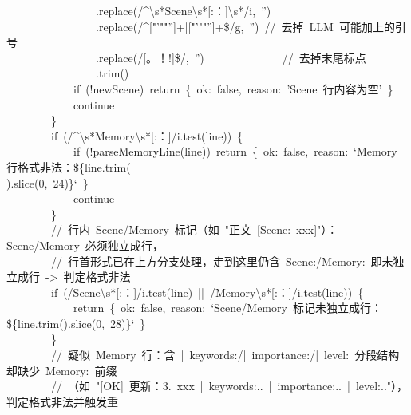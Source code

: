 \documentclass[a4paper,10pt]{article}
\begin{document}
{~~~~~~~~~~~~~~~~.replace(/\textasciicircum{}\textbackslash{}s*Scene\textbackslash{}s*[:：]\textbackslash{}s*/i,~'')\\
~~~~~~~~~~~~~~~~.replace(/\textasciicircum{}["'""'']+|["'""'']+\$/g,~'')~//~去掉~LLM~可能加上的引号\\
~~~~~~~~~~~~~~~~.replace(/[。！!]\$/,~'')~~~~~~~~~~~~~~//~去掉末尾标点\\
~~~~~~~~~~~~~~~~.trim()\\
~~~~~~~~~~~~if~(!newScene)~return~\{~ok:~false,~reason:~'Scene~行内容为空'~\}\\
~~~~~~~~~~~~continue\\
~~~~~~~~\}\\
~~~~~~~~if~(/\textasciicircum{}\textbackslash{}s*Memory\textbackslash{}s*[:：]/i.test(line))~\{\\
~~~~~~~~~~~~if~(!parseMemoryLine(line))~return~\{~ok:~false,~reason:~`Memory~行格式非法：\$\{line.trim(\\
).slice(0,~24)\}`~\}\\
~~~~~~~~~~~~continue\\
~~~~~~~~\}\\
~~~~~~~~//~行内~Scene/Memory~标记（如~"正文~[Scene:~xxx]"）：Scene/Memory~必须独立成行，\\
~~~~~~~~//~行首形式已在上方分支处理，走到这里仍含~Scene:/Memory:~即未独立成行~->~判定格式非法\\
~~~~~~~~if~(/Scene\textbackslash{}s*[:：]/i.test(line)~||~/Memory\textbackslash{}s*[:：]/i.test(line))~\{\\
~~~~~~~~~~~~return~\{~ok:~false,~reason:~`Scene/Memory~标记未独立成行：\$\{line.trim().slice(0,~28)\}`~\}\\
~~~~~~~~\}\\
~~~~~~~~//~疑似~Memory~行：含~|~keywords:/|~importance:/|~level:~分段结构却缺少~Memory:~前缀\\
~~~~~~~~//~（如~"[OK]~更新：3.~xxx~|~keywords:..~|~importance:..~|~level:.."），判定格式非法并触发重
}

\newpage
\end{document}
